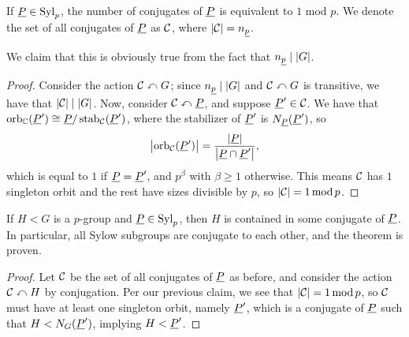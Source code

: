 \begin{claim}
    If $\underline P \in \operatorname{Syl}_p$, the number of conjugates of $\underline P$ is equivalent to $1$ mod $p$. We denote the set of all conjugates of $\underline P$ as $\mathcal C$, where $\left\lvert \mathcal C \right\rvert = n_{\underline p}$.
\end{claim}
\noindent We claim that this is obviously true from the fact that $n_{\underline p} \mid \left\lvert G \right\rvert$.
\begin{proof}
    Consider the action $\mathcal C \curvearrowleft G$; since $n_{\underline p} \mid \left\lvert G \right\rvert$ and $\mathcal C \curvearrowleft G$ is transitive, we have that $\left\lvert \mathcal C \right\rvert \mid \left\lvert G \right\rvert$. Now, consider $\mathcal C \curvearrowleft \underline P$, and suppose $\underline P' \in \mathcal C$. We have that $\operatorname{orb}_\mathbb C(\underline P') \cong \underline P / \operatorname{stab}_\mathcal C(\underline P')$, where the stabilizer of $\underline P'$ is $N_{\underline P}(\underline P')$, so
    \[ \left\lvert \operatorname{orb}_\mathcal C(\underline P') \right\rvert = \frac{\left\lvert \underline P \right\rvert}{\left\lvert \underline P \cap \underline P' \right\rvert}, \]
    which is equal to $1$ if $\underline P = \underline P'$, and $p^\beta$ with $\beta \geq 1$ otherwise. This means $\mathcal C$ has $1$ singleton orbit and the rest have sizes divisible by $p$, so $\left\lvert \mathcal C \right\rvert = 1 \operatorname{mod} p$.
\end{proof}
\begin{claim}
    If $H < G$ is a $p$-group and $\underline P \in \operatorname{Syl}_p$, then $H$ is contained in some conjugate of $\underline P$. In particular, all Sylow subgroups are conjugate to each other, and the theorem is proven.
\end{claim}
\begin{proof}
    Let $\mathcal C$ be the set of all conjugates of $\underline P$ as before, and consider the action $\mathcal C \curvearrowleft H$ by conjugation. Per our previous claim, we see that $\left\lvert \mathcal C \right\rvert = 1 \operatorname{mod} p$, so $\mathcal C$ must have at least one singleton orbit, namely $\underline P'$, which is a conjugate of $\underline P$ such that $H < N_G(\underline P')$, implying $H < \underline P'$.
\end{proof}
